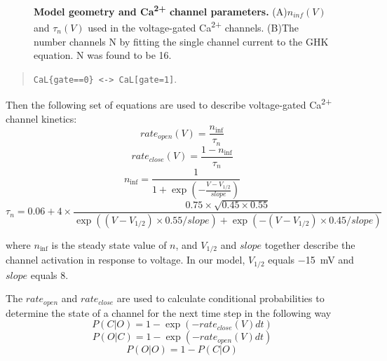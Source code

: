 \documentclass[10pt,letterpaper]{article}
\begin{document}
\begin{figure}[!h]
	\caption{{\bf Model geometry and Ca\textsuperscript{2+} channel parameters.}
	(A)$n_{inf}(V)$ and $\tau_n(V)$ used in the voltage-gated Ca\textsuperscript{2+} channels.
	(B)The number channels N by fitting the single channel current to the GHK equation. N was found to be 16. 
	}
\label{fig14}
\end{figure}

\begin{quote}
 \verb|CaL{gate==0} <-> CaL[gate=1]|.
\end{quote}

Then the following set of equations are used to describe voltage-gated Ca\textsuperscript{2+} channel kinetics:
\begin{equation}rate_{open}(V)=\frac{n_{\inf}}{\tau_n}\end{equation}
\begin{equation}rate_{close}(V)=\frac{1-n_{\inf}}{\tau_n}\end{equation}
\begin{equation}n_{\inf}=\frac{1}{1+\exp(-\frac{V-V_{1/2}}{slope})}\end{equation}
\begin{equation}\tau_n=0.06+4\times\frac{0.75\times\sqrt{0.45\times0.55}}{\exp((V-V_{1/2})\times0.55/slope)+\exp(-(V-V_{1/2})\times0.45/slope)}\end{equation}

where $n_{\inf}$ is the steady state value of $n$, and $V_{1/2}$ and $slope$ together describe the channel activation in response to voltage. In our model, $V_{1/2}$ equals \SI{-15}{\mV} and $slope$ equals 8.

The $rate_{open}$ and $rate_{close}$ are used to calculate conditional probabilities to determine the state of a channel for the next time step in the following way
\begin{equation}P(C|O)=1-\exp(-rate_{close}(V)dt)\end{equation}
\begin{equation}P(O|C)=1-\exp(-rate_{open}(V)dt)\end{equation}
\begin{equation}P(O|O)=1-P(C|O)\end{equation}
\end{document}
